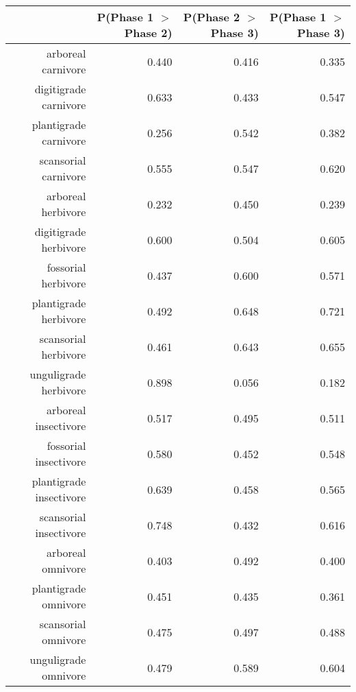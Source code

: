 \begin{table}[ht]
\centering
\begin{tabular}{rrrr}
  \hline
 & P(Phase 1 $>$ Phase 2) & P(Phase 2 $>$ Phase 3) & P(Phase 1 $>$ Phase 3) \\ 
  \hline
arboreal carnivore & 0.440 & 0.416 & 0.335 \\ 
  digitigrade carnivore & 0.633 & 0.433 & 0.547 \\ 
  plantigrade carnivore & 0.256 & 0.542 & 0.382 \\ 
  scansorial carnivore & 0.555 & 0.547 & 0.620 \\ 
  arboreal herbivore & 0.232 & 0.450 & 0.239 \\ 
  digitigrade herbivore & 0.600 & 0.504 & 0.605 \\ 
  fossorial herbivore & 0.437 & 0.600 & 0.571 \\ 
  plantigrade herbivore & 0.492 & 0.648 & 0.721 \\ 
  scansorial herbivore & 0.461 & 0.643 & 0.655 \\ 
  unguligrade herbivore & 0.898 & 0.056 & 0.182 \\ 
  arboreal insectivore & 0.517 & 0.495 & 0.511 \\ 
  fossorial insectivore & 0.580 & 0.452 & 0.548 \\ 
  plantigrade insectivore & 0.639 & 0.458 & 0.565 \\ 
  scansorial insectivore & 0.748 & 0.432 & 0.616 \\ 
  arboreal omnivore & 0.403 & 0.492 & 0.400 \\ 
  plantigrade omnivore & 0.451 & 0.435 & 0.361 \\ 
  scansorial omnivore & 0.475 & 0.497 & 0.488 \\ 
  unguligrade omnivore & 0.479 & 0.589 & 0.604 \\ 
   \hline
\end{tabular}
\label{tab:surv_plant}
\end{table}
